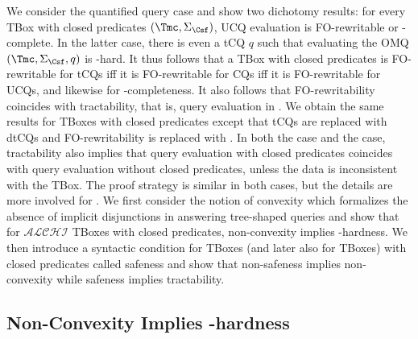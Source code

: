 \documentclass{lmcs}
\theoremstyle{definition}
\begin{document}
We consider the quantified query case and show two dichotomy results:
for every \dlliter TBox with closed predicates $(\Tmc,\Sigma_\Csf)$,
UCQ evaluation is FO-rewritable or \conp-complete. In the latter case,
there is even a tCQ $q$ such that evaluating the OMQ
$(\Tmc,\Sigma_\Csf,q)$ is \conp-hard. It thus follows that a TBox with
closed predicates is FO-rewritable for tCQs iff it is FO-rewritable
for CQs iff it is FO-rewritable for UCQs, and likewise for
\conp-completeness. It also follows that FO-rewritability coincides
with tractability, that is, query evaluation in \ptime.  We obtain the
same results for \EL TBoxes with closed predicates except that tCQs
are replaced with dtCQs and FO-rewritability is replaced with \ptime.
In both the \dlliter case and the \EL case, tractability also implies
that query evaluation with closed predicates coincides with query
evaluation without closed predicates, unless the data is inconsistent with the TBox. 
The proof strategy is similar in both cases, but the details are more involved for \EL. We first
consider the notion of convexity which formalizes the absence of
implicit disjunctions in answering tree-shaped queries and show that
for $\mathcal{ALCHI}$ TBoxes with closed predicates, non-convexity implies
\conp-hardness. We then introduce a syntactic condition for \dlliter
TBoxes (and later also for \EL TBoxes) with closed predicates called
safeness and show that non-safeness implies non-convexity while safeness
implies tractability.
%
%
%
%

\subsection{Non-Convexity Implies \conp-hardness}
\end{document}
